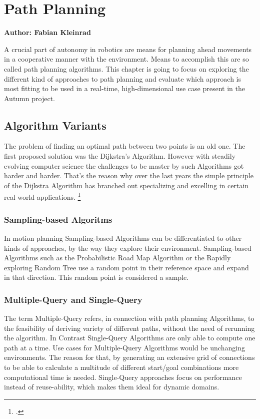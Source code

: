 \chapter{Path Planning}

\textbf{Author: Fabian Kleinrad} 

A crucial part of autonomy in robotics are means for planning ahead movements in a cooperative manner with the environment. Means to accomplish this are so called path planning algorithms. This chapter is going to focus on exploring the different kind of approaches to path planning and evaluate which approach is most fitting to be used in a real-time, high-dimensional use case present in the Autumn project.


\section{Algorithm Variants}

The problem of finding an optimal path between two points is an old one.
The first proposed solution was the Dijkstra's Algorithm. However with steadily evolving computer science the challenges to be master by such Algorithms got harder and harder. That's the reason why over the last years the simple principle of the Dijkstra Algorithm has branched out specializing and excelling in certain real world applications.
\footcite{Pan2020}

\subsection{Sampling-based Algoritms}

In motion planning Sampling-based Algorithms can be differentiated to other kinds of approaches, by the way they explore their environment. Sampling-based Algorithms such as the Probabilistic Road Map Algorithm or the Rapidly exploring Random Tree use a random point in their reference space and expand in that direction. This random point is considered a sample.

\subsection{Multiple-Query and Single-Query}

The term Multiple-Query refers, in connection with path planning Algorithms, to the feasibility of deriving variety of different paths, without the need of rerunning the algorithm. In Contrast Single-Query Algorithms are only able to compute one path at a time.\newline
Use cases for Multiple-Query Algorithms would be unchanging environments. The reason for that, by generating an extensive grid of connections to be able to calculate a multitude of different start/goal combinations  more computational time is needed.\newline
Single-Query approaches focus on performance instead of reuse-ability, which makes them ideal for dynamic domains. 

